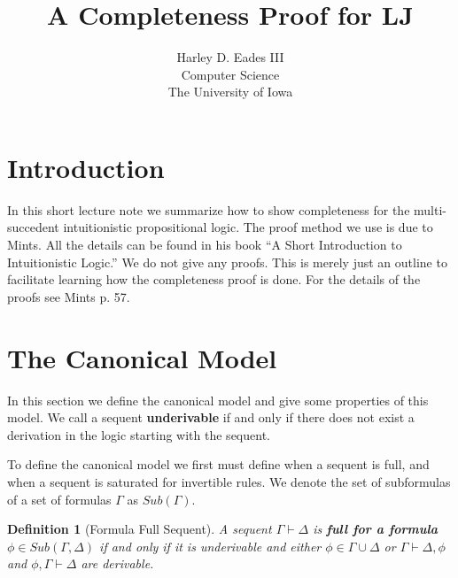 \documentclass{article}
\begin{document}

\newtheorem{thm}{Theorem}
\newtheorem{lemma}[thm]{Lemma}

\newtheorem{corollary}[thm]{Corollary}
\newtheorem{definition}[thm]{Definition}
\newtheorem{remark}[thm]{Remark}
\newtheorem{proposition}[thm]{Proposition}
\newtheorem{notn}[thm]{Notation}
\newtheorem{observation}[thm]{Observation}

\newcommand{\interp}[1]{[\negthinspace[#1]\negthinspace]}
\newcommand{\normto}[0]{\rightsquigarrow^{!}}
\newcommand{\case}[4]{\text{case}\ #1\ \text{of}\ #2\text{.}#3\text{,}#2\text{.}#4}
\newcommand{\join}[0]{\downarrow}

\title{A Completeness Proof for LJ}
\author{Harley D. Eades III \\
Computer Science\\
The University of Iowa}

\maketitle

\section{Introduction}
\label{sec:introduction}
In this short lecture note we summarize how to show completeness for
the multi-succedent intuitionistic propositional logic.  The proof
method we use is due to Mints.  All the details can be found in his
book ``A Short Introduction to Intuitionistic Logic.''  We do not give
any proofs.  This is merely just an outline to facilitate learning how
the completeness proof is done.  For the details of the proofs see Mints
p. 57.  

\section{The Canonical Model}
\label{sec:the_canonical_model}
In this section we define the canonical model and give some properties
of this model.  We call a sequent \textbf{underivable} if and only if
there does not exist a derivation in the logic starting with the
sequent.  

To define the canonical model we first must define when a sequent is
full, and when a sequent is saturated for invertible rules.  We
denote the set of subformulas of a set of formulas $\Gamma$ as
$Sub(\Gamma)$.

\begin{definition}[Formula Full Sequent]
  \label{def:full_sequent}  
  A sequent $\Gamma \vdash \Delta$ is \textbf{full for a formula} $\phi \in Sub(\Gamma,\Delta)$ if and only if 
  it is underivable and either $\phi \in \Gamma \cup \Delta$ or $\Gamma \vdash \Delta,\phi$ and $\phi,\Gamma \vdash \Delta$
  are derivable.
\end{definition}
\end{document}
